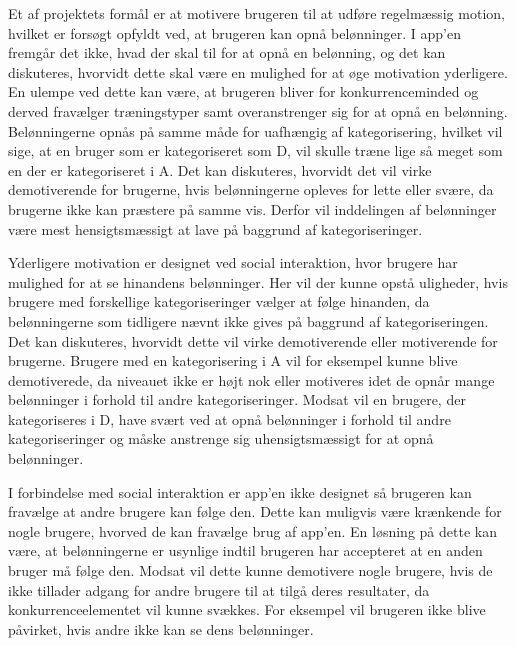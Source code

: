 Et af projektets formål er at motivere brugeren til at udføre regelmæssig motion, hvilket er forsøgt opfyldt ved, at brugeren kan opnå belønninger. I app’en fremgår det ikke, hvad der skal til for at opnå en belønning, og det kan diskuteres, hvorvidt dette skal være en mulighed for at øge motivation yderligere. En ulempe ved dette kan være, at brugeren bliver for konkurrenceminded og derved fravælger træningstyper samt overanstrenger sig for at opnå en belønning. Belønningerne opnås på samme måde for uafhængig af kategorisering, hvilket vil sige, at en bruger som er kategoriseret som D, vil skulle træne lige så meget som en der er kategoriseret i A. Det kan diskuteres, hvorvidt det vil virke demotiverende for brugerne, hvis belønningerne opleves for lette eller svære, da brugerne ikke kan præstere på samme vis. Derfor vil inddelingen af belønninger være mest hensigtsmæssigt at lave på baggrund af kategoriseringer. 

Yderligere motivation er designet ved social interaktion, hvor brugere har mulighed for at se hinandens belønninger. Her vil der kunne opstå uligheder, hvis brugere med forskellige kategoriseringer vælger at følge hinanden, da belønningerne som tidligere nævnt ikke gives på baggrund af kategoriseringen. Det kan diskuteres, hvorvidt dette vil virke demotiverende eller motiverende for brugerne. Brugere med en kategorisering i A vil for eksempel kunne blive demotiverede, da niveauet ikke er højt nok eller motiveres idet de opnår mange belønninger i forhold til andre kategoriseringer. Modsat vil en brugere, der kategoriseres i D, have svært ved at opnå belønninger i forhold til andre kategoriseringer og måske anstrenge sig uhensigtsmæssigt for at opnå belønninger. 

I forbindelse med social interaktion er app’en ikke designet så brugeren kan fravælge at andre brugere kan følge den. Dette kan muligvis være krænkende  for nogle brugere, hvorved de kan fravælge brug af app’en. En løsning på dette kan være, at belønningerne er usynlige indtil brugeren har accepteret at en anden bruger må følge den. Modsat vil dette kunne demotivere nogle brugere, hvis de ikke tillader adgang for andre brugere til at tilgå deres resultater, da konkurrenceelementet vil kunne svækkes. For eksempel vil brugeren ikke blive påvirket, hvis andre ikke kan se dens belønninger.

